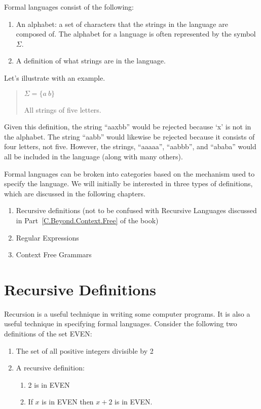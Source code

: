 \documentclass[letterpaper,12pt,openany,reqno]{book}%
\begin{document}
Formal languages consist of the following:
\begin{enumerate}
\item An alphabet: a set of characters that the strings in the language are composed of. The alphabet for a language is often represented by the symbol $\Sigma$.
\item A definition of what strings are in the language.
\end{enumerate}

Let's illustrate with an example. 

\begin{quote}
$\Sigma = \{ a \ b \}$

All strings of five letters.
\end{quote}

Given this definition, the string ``aaxbb'' would be rejected because `x' is not in the alphabet. The string ``aabb'' would likewise be rejected because it consists of four letters, not five. However, the strings, ``aaaaa'', ``aabbb'', and ``ababa'' would all be included in the language (along with many others).

Formal languages can be broken into categories based on the mechanism used to specify the language. We will initially be interested in three types of definitions, which are discussed in the following chapters.
\begin{enumerate}
\item Recursive definitions (not to be confused with Recursive Languages discussed in Part~\ref{C.Beyond.Context.Free} of the book)
\item Regular Expressions
\item Context Free Grammars
\end{enumerate}

\chapter{Recursive Definitions}
Recursion is a useful technique in writing some computer programs. It is also a useful technique in specifying formal languages. Consider the following two definitions of the set EVEN:
\begin{enumerate}
\item The set of all positive integers divisible by 2
\item A recursive definition:
\begin{enumerate}
\item 2 is in EVEN
\item If $x$ is in EVEN then $x+2$ is in EVEN.
\end{enumerate}
\end{enumerate}
\end{document}
